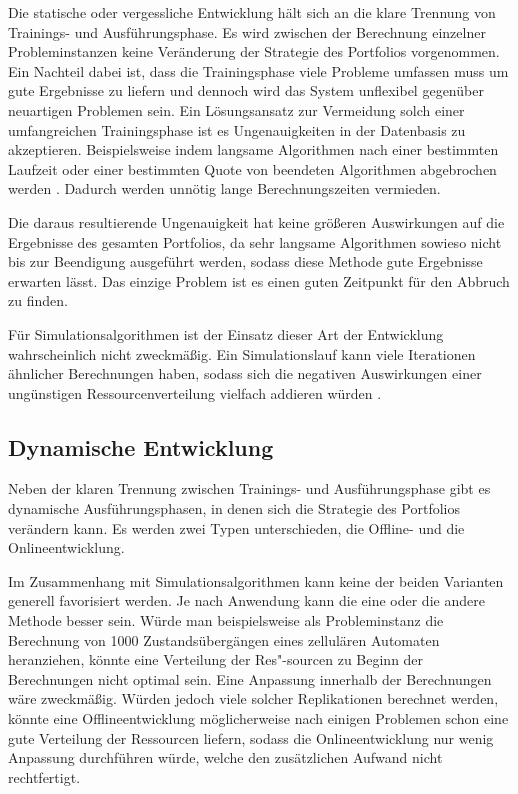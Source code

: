 Die statische oder vergessliche \cite{gaglioloschmidhuber06} Entwicklung hält sich an die klare Trennung von Trainings- und Ausführungsphase. Es wird zwischen der Berechnung einzelner Probleminstanzen keine Veränderung der Strategie des Portfolios vorgenommen. Ein Nachteil dabei ist, dass die Trainingsphase viele Probleme umfassen muss um gute Ergebnisse zu liefern und dennoch wird das System unflexibel gegenüber neuartigen Problemen sein. Ein Lösungsansatz zur Vermeidung solch einer umfangreichen Trainingsphase ist es Ungenauigkeiten in der Datenbasis zu akzeptieren. Beispielsweise indem langsame Algorithmen nach einer bestimmten Laufzeit oder einer bestimmten Quote von beendeten Algorithmen abgebrochen werden \cite{gaglioloschmidhuber06}. Dadurch werden unnötig lange Berechnungszeiten vermieden.

Die daraus resultierende Ungenauigkeit hat keine größeren Auswirkungen auf die Ergebnisse des gesamten Portfolios, da sehr langsame Algorithmen sowieso nicht bis zur Beendigung ausgeführt werden, sodass diese Methode gute Ergebnisse erwarten lässt. Das einzige Problem ist es einen guten Zeitpunkt für den Abbruch zu finden.

Für Simulationsalgorithmen ist der Einsatz dieser Art der Entwicklung wahrscheinlich nicht zweckmäßig. Ein Simulationslauf kann viele Iterationen ähnlicher Berechnungen haben, sodass sich die negativen Auswirkungen einer ungünstigen Ressourcenverteilung vielfach addieren würden \cite{ewald10}.

\subsection{Dynamische Entwicklung}
\label{dynamisch}

Neben der klaren Trennung zwischen Trainings- und Ausführungsphase gibt es dynamische Ausführungsphasen, in denen sich die Strategie des Portfolios verändern kann. Es werden zwei Typen unterschieden, die Offline- und die Onlineentwicklung. 

Im Zusammenhang mit Simulationsalgorithmen kann keine der beiden Varianten generell favorisiert werden. Je nach Anwendung kann die eine oder die andere Methode besser sein. Würde man beispielsweise als Probleminstanz die Berechnung von 1000 Zustandsübergängen eines zellulären Automaten heranziehen, könnte eine Verteilung der Res"-sourcen zu Beginn der Berechnungen nicht optimal sein. Eine Anpassung innerhalb der Berechnungen wäre zweckmäßig. Würden jedoch viele solcher Replikationen berechnet werden, könnte eine Offlineentwicklung möglicherweise nach einigen Problemen schon eine gute Verteilung der Ressourcen liefern, sodass die Onlineentwicklung nur wenig Anpassung durchführen würde, welche den zusätzlichen Aufwand nicht rechtfertigt.


